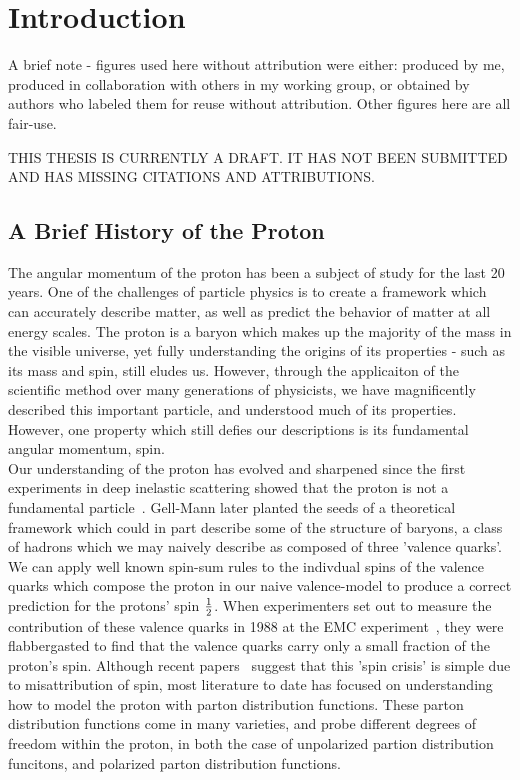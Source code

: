 \chapter{Introduction}

A brief note - figures used here without attribution were either: produced by
me, produced in collaboration with others in my working group, or obtained by
authors who labeled them for reuse without attribution. Other figures here are
all fair-use.

THIS THESIS IS CURRENTLY A DRAFT. IT HAS NOT BEEN SUBMITTED AND HAS MISSING
CITATIONS AND ATTRIBUTIONS. 

\section{A Brief History of the Proton}
The angular momentum of the proton has been a subject of study for the last 20
years\needcite{}. One of the challenges of particle physics is to create a
framework which can accurately describe matter, as well as predict the behavior
of matter at all energy scales. The proton is a baryon which makes up the
majority of the mass in the visible universe, yet fully understanding the
origins of its properties - such as its mass and spin, still eludes us. However,
through the applicaiton of the scientific method over many generations of
physicists, we have magnificently described this important particle, and
understood much of its properties. However, one property which still defies our
descriptions is its fundamental angular momentum, spin. \\
	
Our understanding of the proton has evolved and sharpened since the first
experiments in deep inelastic scattering showed that the proton is not a
fundamental particle~\cite{Breidenbach1969}. Gell-Mann later planted the
seeds of a theoretical framework which could in part describe some of the
structure of baryons, a class of hadrons which we may naively describe as
composed of three 'valence quarks'\needcite{}. We can apply well known spin-sum
rules to the indivdual spins of the valence quarks which compose the proton in
our naive valence-model to produce a correct prediction for the protons' spin
${1}\over{2}$. When experimenters set out to measure the contribution of these
valence quarks in 1988 at the EMC experiment~\cite{Ashman1988}, they
were flabbergasted to find that the valence quarks carry only a small fraction
of the proton's spin. Although recent papers~\cite{Povh2016} suggest that this 'spin
crisis' is simple due to misattribution of spin, most literature to date has
focused on understanding how to model the proton with parton distribution
functions. These parton distribution functions come in many varieties, and probe
different degrees of freedom within the proton, in both the case of unpolarized
partion distribution funcitons, and polarized parton distribution functions. \\
 
